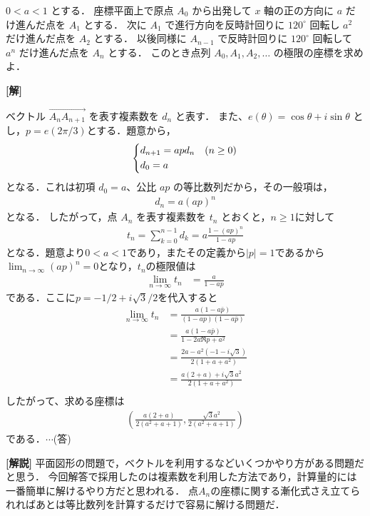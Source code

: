 \documentclass[a4paper,10pt]{ltjsarticle}
\begin{document}
\begin{oframed}
$0 < a < 1$ とする．
座標平面上で原点 $A_0$ から出発して $x$ 軸の正の方向に $a$ だけ進んだ点を $A_1$ とする．
次に $A_1$ で進行方向を反時計回りに $120^\circ$ 回転し $a^2$ だけ進んだ点を $A_2$ とする．
以後同様に $A_{n-1}$ で反時計回りに $120^\circ$ 回転して $a^n$ だけ進んだ点を $A_n$ とする．
このとき点列 $A_0, A_1, A_2, \dots$ の極限の座標を求めよ．
\end{oframed}
\setlength{\columnseprule}{0.4pt}
\begin{multicols}{2}
{\bf[解]}


ベクトル $\vec{A_n A_{n+1}}$ を表す複素数を $d_n$ と表す．
また、$e(\theta) = \cos\theta + i\sin\theta$ とし，$p=e(2\pi/3)$とする．題意から，
\begin{align*}
\begin{dcases}
d_{n+1} = a p d_n & (n \ge 0) \\
d_0 = a &
\end{dcases}  
\end{align*}
となる．これは初項 $d_0 = a$、公比 $ap$ の等比数列だから，その一般項は，
\begin{align*}
d_n = a(ap)^n  
\end{align*}
となる．
したがって，点 $A_n$ を表す複素数を $t_n$ とおくと，$n\ge 1$に対して
\begin{align}
 t_n = \sum_{k=0}^{n-1} d_k = a \frac{1-(ap)^n}{1-ap}  
\end{align}
となる．題意より$0<a<1$であり，またその定義から$|p|=1$であるから
$\lim_{n \to \infty} (ap)^n = 0$となり，$t_n$の極限値は
\begin{align*}
    \lim_{n \to \infty} t_n &= \frac{a}{1-ap} 
\end{align*}
である．ここに$p=-1/2+i\sqrt{3}/2$を代入すると
\begin{align*}
    \lim_{n \to \infty} t_n
    &= \frac{a(1-a\bar{p})}{(1-ap)(1-a\bar{p})} \\
    &= \frac{a(1-a\bar{p})}{1-2a\Re p + a^2} \\
    &= \frac{2a-a^2(-1-i\sqrt{3})}{2(1+a + a^2)} \\
    &= \frac{a(2+a)+i\sqrt{3}a^2}{2(1+a + a^2)} \\
\end{align*}
したがって、求める座標は
\begin{align*}
\left( \frac{a(2+a)}{2(a^2+a+1)}, \frac{\sqrt{3}a^2}{2(a^2+a+1)} \right)  
\end{align*}
である．$\cdots$(答)

\vspace{10pt}
{\bf[解説]}
平面図形の問題で，ベクトルを利用するなどいくつかやり方がある問題だと思う．
今回解答で採用したのは複素数を利用した方法であり，計算量的には一番簡単に解けるやり方だと思われる．
点$A_n$の座標に関する漸化式さえ立てられればあとは等比数列を計算するだけで容易に解ける問題だ．

\newpage
\end{multicols}
\end{document}
